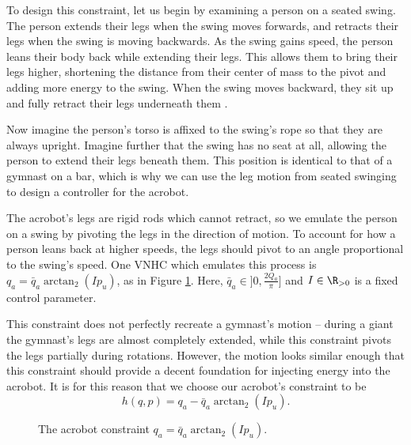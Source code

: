 To design this constraint, let us begin by examining a person on a seated swing.
The person extends their legs when the swing moves forwards, and retracts their
legs when the swing is moving backwards.
As the swing gains speed, the person leans their body back while
extending their legs.
This allows them to bring their legs higher, shortening the distance
from their center of mass to the pivot and adding more energy to the swing.
When the swing moves backward, they sit up and fully retract their legs
underneath them \cite{how_to_pump_a_swing}.

Now imagine the person's torso is affixed to the swing's rope so that they are
always upright. 
Imagine further that the swing has no seat at all, allowing the person to extend
their legs beneath them. 
This position is identical to that of a gymnast on a bar, which is why we can
use the leg motion from seated swinging to design a controller for the acrobot.

The acrobot's legs are rigid rods which cannot retract, so we emulate the person
on a swing by pivoting the legs in the direction of motion. 
To account for how a person leans back at higher speeds, the legs should pivot to an
angle proportional to the swing's speed.
One VNHC which emulates this process is \(q_a = \bar{q}_a\arctan_2( I p_u)\), as
in Figure \ref{fig:qa-arctan}.
Here, \(\bar{q}_a \in ]0,\frac{2 Q_a}{\pi}]\)
and \(I \in \R_{>0}\) is a fixed control parameter.

This constraint does not perfectly recreate a gymnast's motion -- during
a giant the gymnast's legs are almost completely extended, while this constraint
pivots the legs partially during rotations.
However, the motion looks similar enough that this constraint should provide a
decent foundation for injecting energy into the acrobot.
It is for this reason that we choose our acrobot's constraint to be
\begin{equation}\label{eqn:acrobot-constraint}
    h(q,p) = q_a - \bar{q}_a \arctan_2(I p_u)
    .
\end{equation}

\begin{figure}
    \centering
    
    \caption{The acrobot constraint \(q_a = \bar{q}_a \arctan_2(I p_u)\).}
    \label{fig:qa-arctan}
\end{figure}


